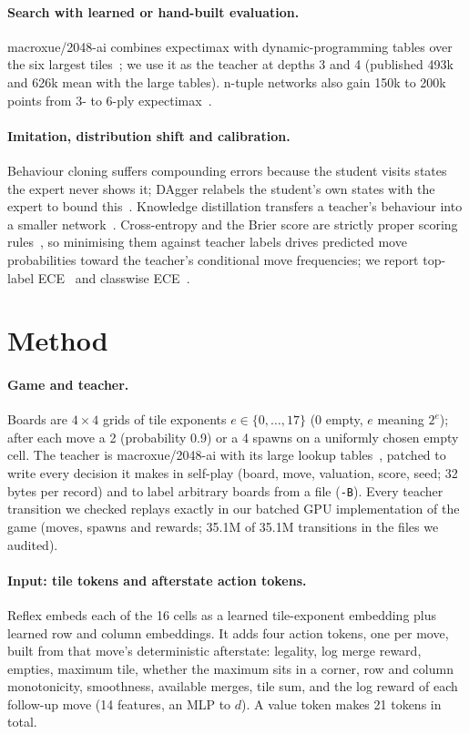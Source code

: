 \documentclass{article}
\newcommand{\method}{Reflex}
\begin{document}
\paragraph{Search with learned or hand-built evaluation.}
macroxue/2048-ai combines expectimax with dynamic-programming tables over the six largest tiles~\citep{xue2022macroxue}; we use it as the teacher at depths 3 and 4 (published 493k and 626k mean with the large tables).
n-tuple networks also gain 150k to 200k points from 3- to 6-ply expectimax~\citep{guei2021optimistic,jaskowski2016mastering}.

\paragraph{Imitation, distribution shift and calibration.}
Behaviour cloning suffers compounding errors because the student visits states the expert never shows it; DAgger relabels the student's own states with the expert to bound this~\citep{ross2011dagger}.
Knowledge distillation transfers a teacher's behaviour into a smaller network~\citep{hinton2015distilling}.
Cross-entropy and the Brier score are strictly proper scoring rules~\citep{gneiting2007proper}, so minimising them against teacher labels drives predicted move probabilities toward the teacher's conditional move frequencies; we report top-label ECE~\citep{guo2017calibration} and classwise ECE~\citep{kull2019dirichlet}.

\section{Method}
\label{sec:method}

\paragraph{Game and teacher.}
Boards are $4\times4$ grids of tile exponents $e\in\{0,\dots,17\}$ ($0$ empty, $e$ meaning $2^e$); after each move a 2 (probability 0.9) or a 4 spawns on a uniformly chosen empty cell.
The teacher is macroxue/2048-ai with its large lookup tables~\citep{xue2022macroxue}, patched to write every decision it makes in self-play (board, move, valuation, score, seed; 32 bytes per record) and to label arbitrary boards from a file (\texttt{-B}).
Every teacher transition we checked replays exactly in our batched GPU implementation of the game (moves, spawns and rewards; 35.1M of 35.1M transitions in the files we audited).

\paragraph{Input: tile tokens and afterstate action tokens.}
\method{} embeds each of the 16 cells as a learned tile-exponent embedding plus learned row and column embeddings.
It adds four action tokens, one per move, built from that move's deterministic afterstate: legality, log merge reward, empties, maximum tile, whether the maximum sits in a corner, row and column monotonicity, smoothness, available merges, tile sum, and the log reward of each follow-up move (14 features, an MLP to $d$).
A value token makes 21 tokens in total.
\end{document}

